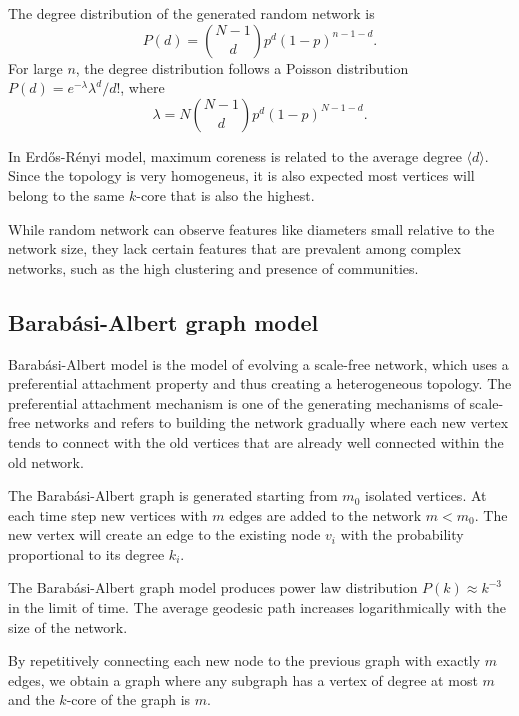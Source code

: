 \documentclass[times, utf8, diplomski]{fer}
\begin{document}
The degree distribution of the generated random network is 
\begin{equation}
P(d) = {{N - 1}\choose{d}}p^d (1 - p)^{n - 1 - d}.
\end{equation}
For large $n$, the degree distribution follows a Poisson distribution $P(d) = e ^{-\lambda}\lambda^d / d!$, where $$\lambda = N {{N - 1}\choose{d}} p^d (1 - p)^{N - 1 - d}.$$

In Erd{\H{o}}s-R{\'{e}}nyi model, maximum coreness is related to the average degree $\langle d \rangle$. Since the topology is very homogeneus, it is also expected most vertices will belong  to the same $k$-core that is also the highest. 

While random network can observe features like diameters small relative to the network size, they lack certain features that are prevalent among complex networks, such as the high clustering and presence of communities. 

\subsection{Barab\'{a}si-Albert graph model}

Barab\'{a}si-Albert model is the model of evolving a scale-free network, which uses a preferential attachment property and thus creating a heterogeneous topology.  The preferential attachment mechanism is one of the generating mechanisms of scale-free networks \cite{Barabasi99emergenceof} and refers to building the network gradually where each new vertex tends to connect with the old vertices that are already well connected within the old network.

The Barab\'{a}si-Albert graph is generated starting from $m_0$ isolated vertices. At each time step new vertices with $m$ edges are added to the network $m < m_0$. The new vertex will create an edge to the existing node $v_i$  with the probability proportional to its degree $k_i$.

 The Barab\'{a}si-Albert graph model produces power law distribution $P(k) \approx k ^{-3}$  in the limit of time. The average geodesic path  increases logarithmically with the size of the network.

By repetitively connecting each new node to the previous graph with exactly $m$ edges, we obtain a graph where any subgraph has a vertex of degree at most $m$ and the $k$-core of the graph is $m$. 
\end{document}
